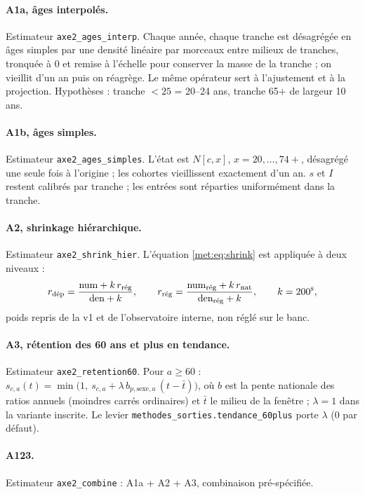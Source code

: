 \paragraph{A1a, âges interpolés.} Estimateur \texttt{axe2\_ages\_interp}. Chaque année, chaque tranche est
désagrégée en âges simples par une densité linéaire par morceaux entre milieux de tranches, tronquée à 0 et
remise à l'échelle pour conserver la masse de la tranche ; on vieillit d'un an puis on réagrège. Le même
opérateur sert à l'ajustement et à la projection. Hypothèses : tranche $<25$ = 20--24 ans\suppose{},
tranche 65+ de largeur 10 ans\suppose.

\paragraph{A1b, âges simples.} Estimateur \texttt{axe2\_ages\_simples}. L'état est
$N[c, x]$, $x = 20, \dots, 74+$, désagrégé une seule fois à l'origine ; les cohortes vieillissent
exactement d'un an. $s$ et $I$ restent calibrés par tranche ; les entrées sont réparties uniformément dans
la tranche\suppose.

\paragraph{A2, shrinkage hiérarchique.} Estimateur \texttt{axe2\_shrink\_hier}. L'équation
\eqref{met:eq:shrink} est appliquée à deux niveaux :
\begin{equation}
  r_{\text{dép}} = \frac{\text{num} + k\, r_{\text{rég}}}{\text{den} + k}, \qquad
  r_{\text{rég}} = \frac{\text{num}_{\text{rég}} + k\, r_{\text{nat}}}{\text{den}_{\text{rég}} + k},
  \qquad k = 200\textsuperscript{\textsc{s}},
\end{equation}
poids repris de la v1 et de l'observatoire interne, non réglé sur le banc.

\paragraph{A3, rétention des 60 ans et plus en tendance.} Estimateur \texttt{axe2\_retention60}. Pour
$a \ge 60$ :
$s_{c,a}(t) = \min\!\big(1,\ s_{c,a} + \lambda\, b_{p,\text{sexe},a}\,(t - \bar t)\big)$, où $b$ est la
pente nationale des ratios annuels (moindres carrés ordinaires) et $\bar t$ le milieu de la fenêtre ;
$\lambda = 1$ dans la variante inscrite. Le levier \texttt{methodes\_sorties.tendance\_60plus} porte
$\lambda$ (0 par défaut).

\paragraph{A123.} Estimateur \texttt{axe2\_combine} : A1a + A2 + A3, combinaison pré-spécifiée.

